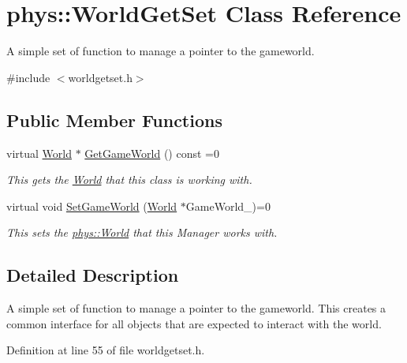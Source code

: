 \hypertarget{classphys_1_1WorldGetSet}{
\section{phys::WorldGetSet Class Reference}
\label{dc/d4f/classphys_1_1WorldGetSet}
}


A simple set of function to manage a pointer to the gameworld.  




{\ttfamily \#include $<$worldgetset.h$>$}

\subsection*{Public Member Functions}
\begin{DoxyCompactItemize}
\item 
virtual \hyperlink{classphys_1_1World}{World} $\ast$ \hyperlink{classphys_1_1WorldGetSet_ae11f48a9152834423647ea44e7fd7ee5}{GetGameWorld} () const =0
\begin{DoxyCompactList}\small\item\em This gets the \hyperlink{classphys_1_1World}{World} that this class is working with. \item\end{DoxyCompactList}\item 
\hypertarget{classphys_1_1WorldGetSet_a03f596502ff3436f249169833ae7f9c6}{
virtual void \hyperlink{classphys_1_1WorldGetSet_a03f596502ff3436f249169833ae7f9c6}{SetGameWorld} (\hyperlink{classphys_1_1World}{World} $\ast$GameWorld\_\-)=0}
\label{dc/d4f/classphys_1_1WorldGetSet_a03f596502ff3436f249169833ae7f9c6}

\begin{DoxyCompactList}\small\item\em This sets the \hyperlink{classphys_1_1World}{phys::World} that this Manager works with. \item\end{DoxyCompactList}\end{DoxyCompactItemize}


\subsection{Detailed Description}
A simple set of function to manage a pointer to the gameworld. This creates a common interface for all objects that are expected to interact with the world. 

Definition at line 55 of file worldgetset.h.



